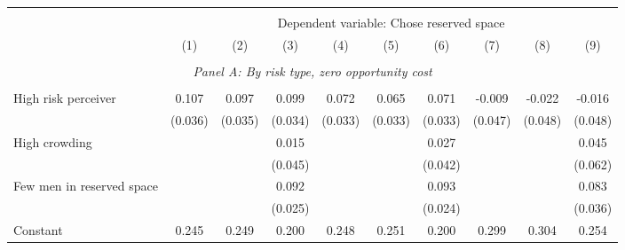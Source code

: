 \begin{tabular}{l*{9}{c}} \hline\hline \\[-1.8ex] & \multicolumn{9}{c}{Dependent variable: Chose reserved space} \\ 
                    &\multicolumn{1}{c}{(1)}         &\multicolumn{1}{c}{(2)}         &\multicolumn{1}{c}{(3)}         &\multicolumn{1}{c}{(4)}         &\multicolumn{1}{c}{(5)}         &\multicolumn{1}{c}{(6)}         &\multicolumn{1}{c}{(7)}         &\multicolumn{1}{c}{(8)}         &\multicolumn{1}{c}{(9)}         \\
 \hline \\[-1ex] \multicolumn{10}{c}{\textit{Panel A: By risk type, zero opportunity cost}} \\\\[-1ex]
High risk perceiver &       0.107\sym{***}&       0.097\sym{***}&       0.099\sym{***}&       0.072\sym{**} &       0.065\sym{**} &       0.071\sym{**} &      -0.009         &      -0.022         &      -0.016         \\
                    &     (0.036)         &     (0.035)         &     (0.034)         &     (0.033)         &     (0.033)         &     (0.033)         &     (0.047)         &     (0.048)         &     (0.048)         \\
[1em]
High crowding       &                     &                     &       0.015         &                     &                     &       0.027         &                     &                     &       0.045         \\
                    &                     &                     &     (0.045)         &                     &                     &     (0.042)         &                     &                     &     (0.062)         \\
[1em]
Few men in reserved space&                     &                     &       0.092\sym{***}&                     &                     &       0.093\sym{***}&                     &                     &       0.083\sym{**} \\
                    &                     &                     &     (0.025)         &                     &                     &     (0.024)         &                     &                     &     (0.036)         \\
[1em]
Constant            &       0.245\sym{***}&       0.249\sym{***}&       0.200\sym{***}&       0.248\sym{***}&       0.251\sym{***}&       0.200\sym{***}&       0.299\sym{***}&       0.304\sym{***}&       0.254\sym{***}\\

\end{tabular}
